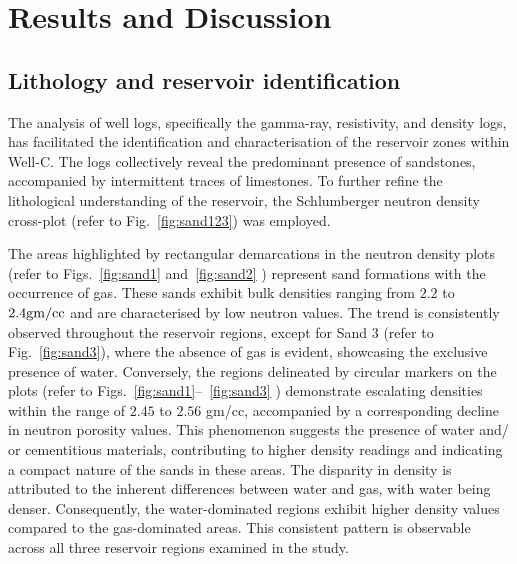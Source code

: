 \documentclass{gji}
\begin{document}
\section{Results and Discussion} \label{sec:RnD}

\subsection{Lithology and reservoir identification } \label{subsec:reserv}

The analysis of well logs, specifically the gamma-ray, resistivity, and density logs, has facilitated the identification and characterisation of the reservoir zones within Well-C.
The logs collectively reveal the predominant presence of sandstones, accompanied by intermittent traces of limestones.
To further refine the lithological understanding of the reservoir, the Schlumberger neutron density cross-plot (refer to Fig.~\ref{fig:sand123}) was employed. 

The areas highlighted by rectangular demarcations in the neutron density plots (refer to Figs.~\ref{fig:sand1} and~\ref{fig:sand2} ) represent sand formations with the occurrence of gas. 
These sands exhibit bulk densities ranging from $2.2$ to $\rm 2.4 gm/cc$ and are characterised by low neutron values. 
The trend is consistently observed throughout the reservoir regions, except for Sand $3$ (refer to Fig.~\ref{fig:sand3}), where the absence of gas is evident, showcasing the exclusive presence of water.
Conversely, the regions delineated by circular markers on the plots (refer to Figs.~\ref{fig:sand1}--~\ref{fig:sand3} ) demonstrate escalating densities within the range of $2.45$ to $2.56$ gm/cc, accompanied by a corresponding decline in neutron porosity values. 
This phenomenon suggests the presence of water and/ or cementitious materials, contributing to higher density readings and indicating a compact nature of the sands in these areas.
The disparity in density is attributed to the inherent differences between water and gas, with water being denser.
Consequently, the water-dominated regions exhibit higher density values compared to the gas-dominated areas. This consistent pattern is observable across all three reservoir regions examined in the study.
\end{document}
